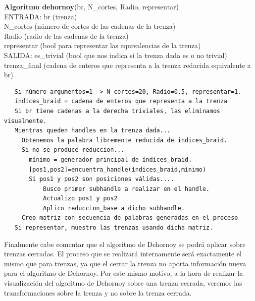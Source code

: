 \begin{alg}
	\textbf{Algoritmo dehornoy}(br, N\_cortes, Radio, representar)\\
	ENTRADA: br (trenza)\\
	\hspace*{2.2cm} N\_cortes (número de cortes de las cadenas de la trenza)\\
	\hspace*{2.2cm} Radio (radio de las cadenas de la trenza)\\
	\hspace*{2.2cm} representar (bool para representar las equivalencias de la trenza)\\
	SALIDA: \hspace{0.4cm} es\_trivial (bool que nos indica si la trenza dada es o no trivial) \\
	\hspace*{2.2cm} trenza\_final (cadena de enteros que representa a la trenza reducida equivalente a br)
	
\begin{lstlisting}
   Si número_argumentos=1 -> N_cortes=20, Radio=0.5, representar=1.
   índices_braid = cadena de enteros que representa a la trenza
   Si br tiene cadenas a la derecha triviales, las eliminamos visualmente.
   Mientras queden handles en la trenza dada...
	 Obtenemos la palabra libremente reducida de indices_braid.
	 Si no se produce reduccion...
	   mínimo = generador principal de índices_braid.
	   [pos1,pos2]=encuentra_handle(índices_braid,mínimo)
	   Si pos1 y pos2 son posiciones válidas....
		   Busco primer subhandle a realizar en el handle.
		   Actualizo pos1 y pos2
		   Aplico reduccion_base a dicho subhandle.
	 Creo matriz con secuencia de palabras generadas en el proceso
   Si representar, muestro las trenzas usando dicha matriz.			   
\end{lstlisting}
\end{alg}

Finalmente cabe comentar que el algoritmo de Dehornoy se podrá aplicar sobre trenzas cerradas. El proceso que se realizará internamente será exactamente el mismo que para trenzas, ya que el cerrar la trenza no aporta información nueva para el algoritmo de Dehornoy. Por este mismo motivo, a la hora de realizar la visualización del algoritmo de Dehornoy sobre una trenza cerrada, veremos las transformaciones sobre la trenza y no sobre la trenza cerrada. \\

